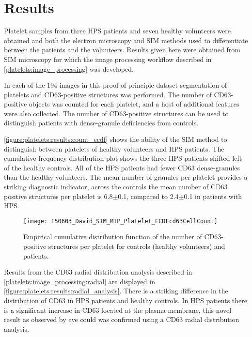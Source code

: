 \section{Results}
\label{platelets:results}
Platelet samples from three HPS patients and seven healthy volunteers were obtained and both the electron microscopy and SIM methods used to differentiate between the patients and the volunteers. Results given here were obtained from SIM microscopy for which the image processing workflow described in \autoref{platelets:image_processing} was developed.

In each of the 194 images in this proof-of-principle dataset segmentation of platelets and CD63-positive structures was performed. The number of CD63-positive objects was counted for each platelet, and a host of additional features were also collected. The number of CD63-positive structures can be used to distinguish patients with dense-granule deficiencies from controls.

\autoref{figure:platelets:results:count_ecdf} shows the ability of the SIM method to distinguish between platelets of healthy volunteers and HPS patients. The cumulative frequency distribution plot shows the three HPS patients shifted left of the healthy controls. All of the HPS patients had fewer CD63 dense-granules than the healthy volunteers. The mean number of granules per platelet provides a striking diagnostic indicator, across the controls the mean number of CD63 positive structures per platelet is 6.8$\pm$0.1, compared to 2.4$\pm$0.1 in patients with HPS.

\begin{figure}[htbp]{}
	\centering
	\texttt{[image: 150603\_David\_SIM\_MIP\_Platelet\_ECDFcd63CellCount]}
\caption[Platelet CD63-positive structures empirical cumulative frequency]{Empirical cumulative distribution function of the number of CD63-positive structures per platelet for controls (healthy volunteers) and patients.}
\label{figure:platelets:results:count_ecdf}
\end{figure}

Results from the CD63 radial distribution analysis described in \autoref{platelets:image_processing:radial} are displayed in \autoref{figure:platelets:results:radial_analysis}. There is a striking difference in the distribution of CD63 in HPS patients and healthy controls. In HPS patients there is a significant increase in CD63 located at the plasma membrane, this novel result as observed by eye could was confirmed using a CD63 radial distribution analysis.

